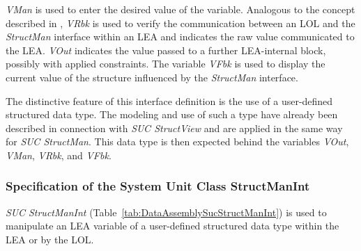 \emph{VMan} is used to enter the desired value of the variable. Analogous to the concept described in \cite{PNO.2025.Part3}, \emph{VRbk} is used to verify the communication between an LOL and the \emph{StructMan} interface within an LEA and indicates the raw value communicated to the LEA. \emph{VOut} indicates the value passed to a further LEA-internal block, possibly with applied constraints. The variable \emph{VFbk} is used to display the current value of the structure influenced by the \emph{StructMan} interface. 

The distinctive feature of this interface definition is the use of a user-defined structured data type. The modeling and use of such a type have already been described in connection with \emph{SUC StructView} and are applied in the same way for \emph{SUC StructMan}. This data type is then expected behind the variables \emph{VOut}, \emph{VMan}, \emph{VRbk}, and \emph{VFbk}. 

\subsubsection{Specification of the System Unit Class StructManInt}

\emph{SUC StructManInt} (Table~\ref{tab:DataAssemblySucStructManInt}) is used to manipulate an LEA variable of a user-defined structured data type within the LEA or by the LOL.

